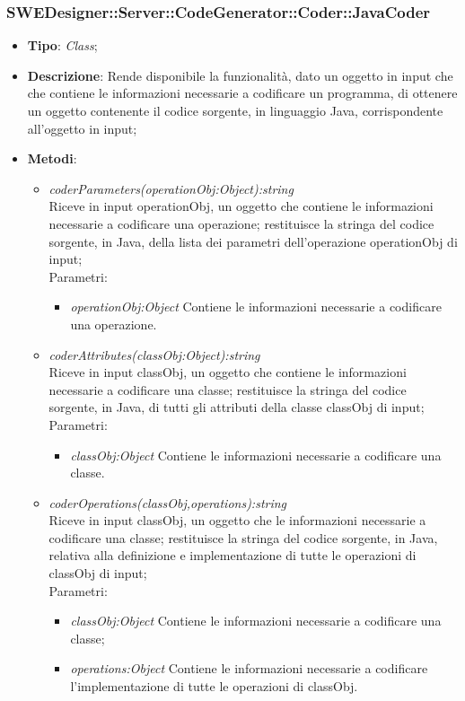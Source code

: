\documentclass[../DefinizioneDiProdotto.tex]{subfiles}
\begin{document}
			\subsubsection{SWEDesigner::Server::CodeGenerator::Coder::JavaCoder}
			\hypertarget{SWEDesigner::Server::CodeGenerator::Coder::JavaCoder}{}
			\begin{itemize}
				\item \textbf{Tipo}: \emph{Class};
				\item \textbf{Descrizione}: Rende disponibile la funzionalità, dato un oggetto in input che che contiene le informazioni necessarie a codificare un programma, di ottenere un oggetto contenente il codice sorgente, in linguaggio Java, corrispondente all'oggetto in input;\\
				\item \textbf{Metodi}:
				\begin{itemize}
					\item \emph{coderParameters(operationObj:Object):string} \\ 
					Riceve in input operationObj, un oggetto che contiene le informazioni necessarie a codificare una operazione; 
					restituisce la stringa del codice sorgente, in Java, della lista dei parametri dell'operazione operationObj di input; \\
					Parametri:
					\begin{itemize}
						\item \emph{operationObj:Object} Contiene le informazioni necessarie a codificare una operazione.
					\end{itemize}
					
					\item \emph{coderAttributes(classObj:Object):string} \\ 
					Riceve in input classObj, un oggetto che contiene le informazioni necessarie a codificare una classe; 
					restituisce la stringa del codice sorgente, in Java, di tutti gli attributi della classe classObj di input; \\
					Parametri:
					\begin{itemize}
						\item \emph{classObj:Object} Contiene le informazioni necessarie a codificare una classe.
					\end{itemize}
					
					\item \emph{coderOperations(classObj,operations):string} \\ 
					Riceve in input classObj, un oggetto che le informazioni necessarie a codificare una classe; 
					restituisce la stringa del codice sorgente, in Java, relativa alla definizione e implementazione di tutte le operazioni di classObj di input; \\
					Parametri:
					\begin{itemize}
						\item \emph{classObj:Object} Contiene le informazioni necessarie a codificare una classe;
						\item \emph{operations:Object} Contiene le informazioni necessarie a codificare l'implementazione di tutte le operazioni di classObj.
					\end{itemize}
					

\end{itemize}
\end{itemize}
\end{document}
